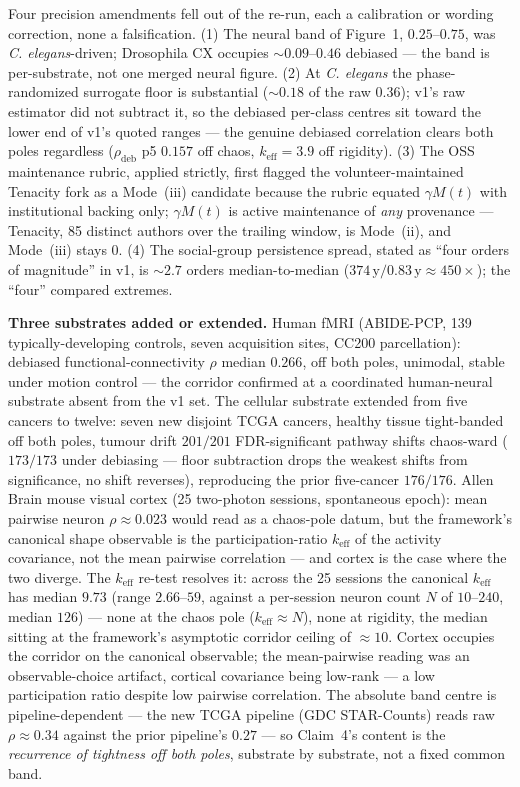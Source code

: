 \documentclass[11pt,a4paper]{article}
\newcommand{\keff}{k_{\text{eff}}}
\begin{document}
Four precision amendments fell out of the re-run, each a calibration or wording correction, none a falsification. (1) The neural band of Figure~1, $0.25$--$0.75$, was \emph{C. elegans}-driven; Drosophila CX occupies $\sim 0.09$--$0.46$ debiased --- the band is per-substrate, not one merged neural figure. (2) At \emph{C. elegans} the phase-randomized surrogate floor is substantial ($\sim 0.18$ of the raw $0.36$); v1's raw estimator did not subtract it, so the debiased per-class centres sit toward the lower end of v1's quoted ranges --- the genuine debiased correlation clears both poles regardless ($\rho_{\text{deb}}$ p5 $0.157$ off chaos, $\keff = 3.9$ off rigidity). (3) The OSS maintenance rubric, applied strictly, first flagged the volunteer-maintained Tenacity fork as a Mode~(iii) candidate because the rubric equated $\gamma M(t)$ with institutional backing only; $\gamma M(t)$ is active maintenance of \emph{any} provenance --- Tenacity, 85 distinct authors over the trailing window, is Mode~(ii), and Mode~(iii) stays $0$. (4) The social-group persistence spread, stated as ``four orders of magnitude'' in v1, is $\sim 2.7$ orders median-to-median ($374\,\mathrm{y} / 0.83\,\mathrm{y} \approx 450\times$); the ``four'' compared extremes.

\textbf{Three substrates added or extended.} Human fMRI (ABIDE-PCP, 139 typically-developing controls, seven acquisition sites, CC200 parcellation): debiased functional-connectivity $\rho$ median $0.266$, off both poles, unimodal, stable under motion control --- the corridor confirmed at a coordinated human-neural substrate absent from the v1 set. The cellular substrate extended from five cancers to twelve: seven new disjoint TCGA cancers, healthy tissue tight-banded off both poles, tumour drift $201/201$ FDR-significant pathway shifts chaos-ward ($173/173$ under debiasing --- floor subtraction drops the weakest shifts from significance, no shift reverses), reproducing the prior five-cancer $176/176$. Allen Brain mouse visual cortex (25 two-photon sessions, spontaneous epoch): mean pairwise neuron $\rho \approx 0.023$ would read as a chaos-pole datum, but the framework's canonical shape observable is the participation-ratio $\keff$ of the activity covariance, not the mean pairwise correlation --- and cortex is the case where the two diverge. The $\keff$ re-test resolves it: across the 25 sessions the canonical $\keff$ has median $9.73$ (range $2.66$--$59$, against a per-session neuron count $N$ of $10$--$240$, median $126$) --- none at the chaos pole ($\keff \approx N$), none at rigidity, the median sitting at the framework's asymptotic corridor ceiling of $\approx 10$. Cortex occupies the corridor on the canonical observable; the mean-pairwise reading was an observable-choice artifact, cortical covariance being low-rank --- a low participation ratio despite low pairwise correlation. The absolute band centre is pipeline-dependent --- the new TCGA pipeline (GDC STAR-Counts) reads raw $\rho \approx 0.34$ against the prior pipeline's $0.27$ --- so Claim~4's content is the \emph{recurrence of tightness off both poles}, substrate by substrate, not a fixed common band.
\end{document}
